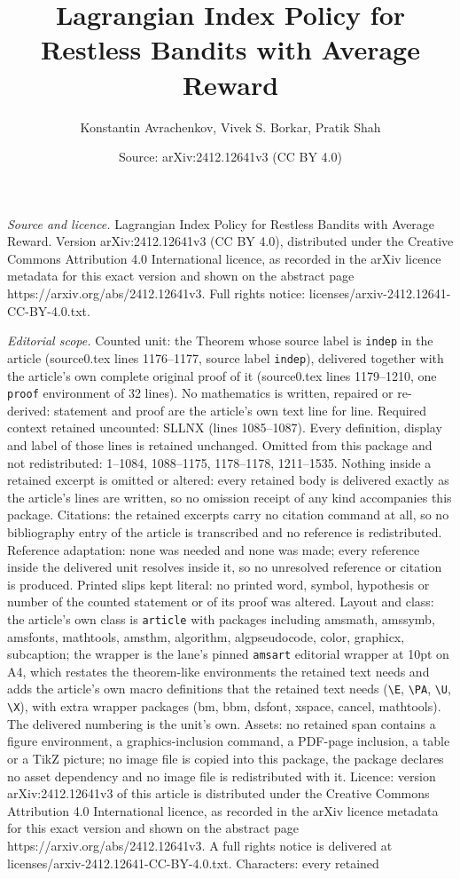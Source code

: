 \documentclass[10pt,a4paper]{amsart}
\title[Lagrangian Index Policy for Restless Bandits with Average Re]{Lagrangian Index Policy for Restless Bandits with Average Reward}
\author{Konstantin Avrachenkov, Vivek S. Borkar, Pratik Shah}
\date{Source: arXiv:2412.12641v3 (CC BY 4.0)}
\begin{document}
\maketitle

\noindent\emph{Source and licence.} Lagrangian Index Policy for Restless Bandits with Average Reward. Version arXiv:2412.12641v3 (CC BY 4.0), distributed under the Creative Commons Attribution 4.0 International licence, as recorded in the arXiv licence metadata for this exact version and shown on the abstract page https://arxiv.org/abs/2412.12641v3. Full rights notice: licenses/arxiv-2412.12641-CC-BY-4.0.txt.\par\smallskip

\noindent\textit{Editorial scope.} Counted unit: the Theorem whose source label is \texttt{indep} in the article (source0.tex lines 1176--1177, source label \texttt{indep}), delivered together with the article's own complete original proof of it (source0.tex lines 1179--1210, one \texttt{proof} environment of 32 lines). No mathematics is written, repaired or re-derived: statement and proof are the article's own text line for line. Required context retained uncounted: SLLNX (lines 1085--1087). Every definition, display and label of those lines is retained unchanged. Omitted from this package and not redistributed: 1--1084, 1088--1175, 1178--1178, 1211--1535. Nothing inside a retained excerpt is omitted or altered: every retained body is delivered exactly as the article's lines are written, so no omission receipt of any kind accompanies this package. Citations: the retained excerpts carry no citation command at all, so no bibliography entry of the article is transcribed and no reference is redistributed. Reference adaptation: none was needed and none was made; every reference inside the delivered unit resolves inside it, so no unresolved reference or citation is produced. Printed slips kept literal: no printed word, symbol, hypothesis or number of the counted statement or of its proof was altered. Layout and class: the article's own class is \texttt{article} with packages including amsmath, amssymb, amsfonts, mathtools, amsthm, algorithm, algpseudocode, color, graphicx, subcaption; the wrapper is the lane's pinned \texttt{amsart} editorial wrapper at 10pt on A4, which restates the theorem-like environments the retained text needs and adds the article's own macro definitions that the retained text needs (\texttt{\textbackslash E}, \texttt{\textbackslash PA}, \texttt{\textbackslash U}, \texttt{\textbackslash X}), with extra wrapper packages (bm, bbm, dsfont, xspace, cancel, mathtools). The delivered numbering is the unit's own. Assets: no retained span contains a figure environment, a graphics-inclusion command, a PDF-page inclusion, a table or a TikZ picture; no image file is copied into this package, the package declares no asset dependency and no image file is redistributed with it. Licence: version arXiv:2412.12641v3 of this article is distributed under the Creative Commons Attribution 4.0 International licence, as recorded in the arXiv licence metadata for this exact version and shown on the abstract page https://arxiv.org/abs/2412.12641v3. A full rights notice is delivered at licenses/arxiv-2412.12641-CC-BY-4.0.txt. Characters: every retained 
\end{document}
